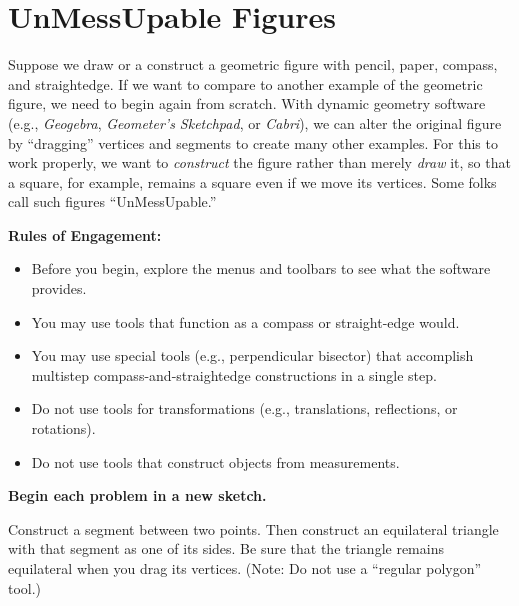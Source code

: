 \newpage

\section{UnMessUpable Figures}

Suppose we draw or a construct a geometric figure with pencil, paper, compass, and straightedge.  If we want to compare to another example of the geometric figure, we need to begin again from scratch.  With dynamic geometry software (e.g., \textsl{Geogebra}, \textsl{Geometer's Sketchpad}, or \textsl{Cabri}), we can alter the original figure by ``dragging'' vertices and segments to create many other examples.  For this to work properly, we want to \emph{construct} the figure rather than merely \emph{draw} it, so that a square, for example, remains a square even if we move its vertices.  Some folks call such figures ``UnMessUpable.'' 

\vspace{0.1in}
\begin{center}
\textbf{Rules of Engagement:}
\end{center}
\begin{itemize}
\itemsep0em
\item Before you begin, explore the menus and toolbars to see what the software provides.  
\item You may use tools that function as a compass or straight-edge would.  
\item You may use special tools (e.g., perpendicular bisector) that accomplish multistep     
compass-and-straightedge constructions in a single step.
\item Do not use tools for transformations (e.g., translations, reflections, or rotations).
\item Do not use tools that construct objects from measurements.  
\end{itemize}

\begin{center}
\textbf{Begin each problem in a new sketch.}
\end{center}

\begin{prob}
Construct a segment between two points.  Then construct an equilateral triangle with that segment as one of its sides.  Be sure that the triangle remains equilateral when you drag its vertices.   (Note:  Do not use a ``regular polygon'' tool.)
\end{prob}

